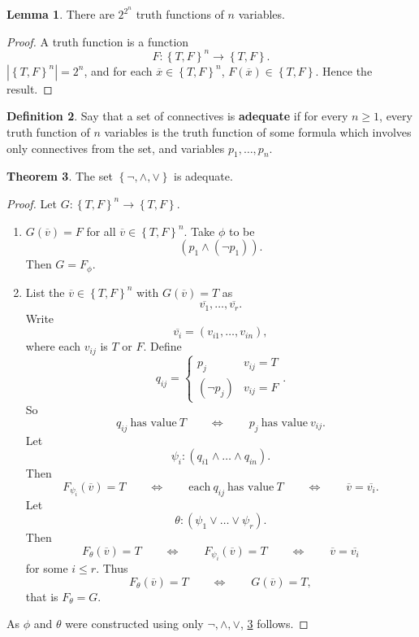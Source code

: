 \documentclass{article}
\newcommand{\rb}[1]{\left( #1 \right)}
\newcommand{\cb}[1]{\left\{ #1 \right\}}
\newcommand{\abs}[1]{\left\lvert #1 \right\rvert}
\newcommand{\notb}[1]{\rb{\neg #1}}
\newcommand{\andb}[2]{\rb{#1 \land #2}}
\theoremstyle{definition}\newtheorem{definition}{Definition}[subsection]
\theoremstyle{definition}\newtheorem{remark1}[definition]{Remark}
\theoremstyle{definition}\newtheorem{example1}[definition]{Example}
\theoremstyle{definition}\newtheorem*{remark2}{Remark}
\theoremstyle{definition}\newtheorem*{example2}{Example}
\theoremstyle{definition}\newtheorem*{note}{Note}
\theoremstyle{definition}\newtheorem*{notation}{Notation}
\newtheorem{lemma}[definition]{Lemma}
\newtheorem{theorem}[definition]{Theorem}
\begin{document}
\begin{lemma}
There are $ 2^{2^n} $ truth functions of $ n $ variables.
\end{lemma}

\begin{proof}
A truth function is a function
$$ F : \cb{T, F}^n \to \cb{T, F}. $$
$ \abs{\cb{T, F}^n} = 2^n $, and for each $ \overline{x} \in \cb{T, F}^n $, $ F\rb{\overline{x}} \in \cb{T, F} $. Hence the result.
\end{proof}

\begin{definition}
Say that a set of connectives is \textbf{adequate} if for every $ n \ge 1 $, every truth function of $ n $ variables is the truth function of some formula which involves only connectives from the set, and variables $ p_1, \dots, p_n $.
\end{definition}

\pagebreak

\begin{theorem}
\label{thm:1.1.9}
The set $ \cb{\neg, \land, \lor} $ is adequate.
\end{theorem}

\begin{proof}
Let $ G : \cb{T, F}^n \to \cb{T, F} $.
\begin{enumerate}[leftmargin=0.5in, label=Case \arabic*.]
\item $ G\rb{\overline{v}} = F $ for all $ \overline{v} \in \cb{T, F}^n $. Take $ \phi $ to be
$$ \andb{p_1}{\notb{p_1}}. $$
Then $ G = F_\phi $.
\item List the $ \overline{v} \in \cb{T, F}^n $ with $ G\rb{\overline{v}} = T $ as
$$ \overline{v_1}, \dots, \overline{v_r}. $$
Write
$$ \overline{v_i} = \rb{v_{i1}, \dots, v_{in}}, $$
where each $ v_{ij} $ is $ T $ or $ F $. Define
$$ q_{ij} = \begin{cases}
p_j & v_{ij} = T \\
\notb{p_j} & v_{ij} = F
\end{cases}. $$
So
$$ q_{ij} \ \text{has value} \ T \qquad \iff \qquad p_j \ \text{has value} \ v_{ij}. $$
Let
$$ \psi_i : \rb{q_{i1} \land \dots \land q_{in}}. $$
Then
$$ F_{\psi_i}\rb{\overline{v}} = T \qquad \iff \qquad \text{each} \ q_{ij} \ \text{has value} \ T \qquad \iff \qquad \overline{v} = \overline{v_i}. $$
Let
$$ \theta : \rb{\psi_1 \lor \dots \lor \psi_r}. $$
Then
$$ F_\theta\rb{\overline{v}} = T \qquad \iff \qquad F_{\psi_i}\rb{\overline{v}} = T \qquad \iff \qquad \overline{v} = \overline{v_i} $$
for some $ i \le r $. Thus
$$ F_\theta\rb{\overline{v}} = T \qquad \iff \qquad G\rb{\overline{v}} = T, $$
that is $ F_\theta = G $.
\end{enumerate}
As $ \phi $ and $ \theta $ were constructed using only $ \neg, \land, \lor $, \ref{thm:1.1.9} follows.
\end{proof}
\end{document}

